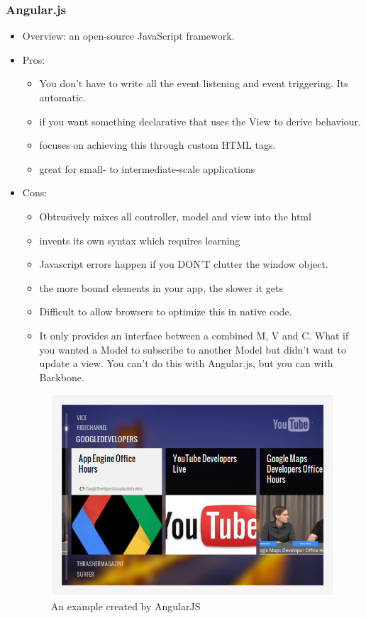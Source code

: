 \documentclass[14pt,a4paper]{extreport}
\begin{document}
		\subsubsection{Angular.js}
			\begin{itemize}
				\item Overview:  an open-source JavaScript framework.
				\item Pros: 
					\begin{itemize}
						\item You don't have to write all the event listening and event triggering. Its automatic.
						\item if you want something declarative that uses the View to derive behaviour.
						\item focuses on achieving this through custom HTML tags.
						\item great for small- to intermediate-scale applications
					\end{itemize}
				\item Cons:
					\begin{itemize}
						\item Obtrusively mixes all controller, model and view into the html
						\item invents its own syntax which requires learning
						\item Javascript errors happen if you DON'T clutter the window object.
						\item the more bound elements in your app, the slower it gets
						\item Difficult to allow browsers to optimize this in native code.
						\item It only provides an interface between a combined M, V and C. What if you wanted a Model to subscribe to another Model but didn't want to update a view. You can't do this with Angular.js, but you can with Backbone.
					\end{itemize}
					\begin{figure}
						\begin{center}
							\includegraphics[scale=0.5]{Angular.png}
							\caption{An example created by AngularJS}
						\end{center}
					\end{figure}
			\end{itemize}
\end{document}
